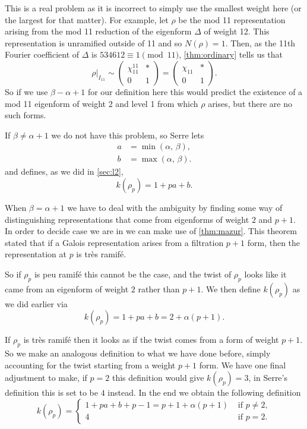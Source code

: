 \documentclass[a4paper,12pt]{article}
\begin{document}
This is a real problem as it is incorrect to simply use the smallest weight here (or the largest for that matter).
For example, let $\rho$ be the mod 11 representation arising from the mod 11 reduction of the eigenform $\Delta$ of weight 12.
This representation is unramified outside of 11 and so $N(\rho) =1$.
Then, as the 11th Fourier coefficient of $\Delta$ is $534612\equiv 1 \pmod{11}$, \cref{thm:ordinary} tells us that
\[
\rho|_{I_{11}} \sim \begin{pmatrix} \chi_{11}^{11} & * \\ 0 & 1\end{pmatrix} = \begin{pmatrix} \chi_{11} & * \\ 0 & 1\end{pmatrix}.
\]
So if we use $\beta - \alpha + 1$ for our definition here this would predict the existence of a mod 11 eigenform of weight 2 and level 1 from which $\rho$ arises, but there are no such forms.

If $\beta \ne \alpha + 1$ we do not have this problem, so Serre lets
\begin{align*}
a &= \min(\alpha,\, \beta),\\
b &= \max(\alpha,\, \beta).
\end{align*}
and defines, as we did in \cref{sec:l2},
\begin{equation}\label{eq:l1nt}
k(\rho_p) = 1 + pa + b.
\end{equation}

When $\beta = \alpha + 1$ we have to deal with the ambiguity by finding some way of distinguishing representations that come from eigenforms of weight $2$ and $p + 1$.
In order to decide case we are in we can make use of \cref{thm:mazur}.
This theorem stated that if a Galois representation arises from a filtration $p+1$ form, then the representation at $p$ is tr\`es ramif\'e.

So if $\rho_p$ is peu ramif\'e this cannot be the case, and the twist of $\rho_p$ looks like it came from an eigenform of weight $2$ rather than $p+1$.
We then define $k(\rho_p)$ as we did earlier via
\begin{equation}\label{eq:peu}
k(\rho_p) = 1 + pa + b = 2 + \alpha(p+1).
\end{equation}

If $\rho_p$ is tr\`es ramif\'e then it looks as if the twist comes from a form of weight $p+1$.
So we make an analogous definition to what we have done before, simply accounting for the twist starting from a weight $p+1$ form.
We have one final adjustment to make, if $p=2$ this definition would give $k(\rho_p) = 3$, in Serre's definition this is set to be $4$ instead.
In the end we obtain the following definition
\begin{equation}\label{eq:tres}
k(\rho_p) = \begin{cases}
1 + pa + b + p - 1 = p + 1 + \alpha(p+1) & \text{ if }p\ne 2,\\
4 & \text{ if } p = 2.
\end{cases}
\end{equation}
\end{document}
